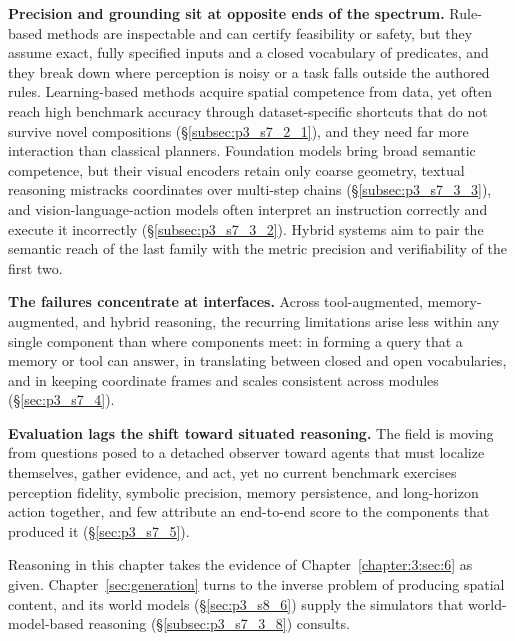 \textbf{Precision and grounding sit at opposite ends of the spectrum.} Rule-based methods are inspectable and can certify feasibility or safety, but they assume exact, fully specified inputs and a closed vocabulary of predicates, and they break down where perception is noisy or a task falls outside the authored rules. Learning-based methods acquire spatial competence from data, yet often reach high benchmark accuracy through dataset-specific shortcuts that do not survive novel compositions (§\ref{subsec:p3_s7_2_1}), and they need far more interaction than classical planners. Foundation models bring broad semantic competence, but their visual encoders retain only coarse geometry, textual reasoning mistracks coordinates over multi-step chains (§\ref{subsec:p3_s7_3_3}), and vision-language-action models often interpret an instruction correctly and execute it incorrectly (§\ref{subsec:p3_s7_3_2}). Hybrid systems aim to pair the semantic reach of the last family with the metric precision and verifiability of the first two.

\textbf{The failures concentrate at interfaces.} Across tool-augmented, memory-augmented, and hybrid reasoning, the recurring limitations arise less within any single component than where components meet: in forming a query that a memory or tool can answer, in translating between closed and open vocabularies, and in keeping coordinate frames and scales consistent across modules (§\ref{sec:p3_s7_4}).

\textbf{Evaluation lags the shift toward situated reasoning.} The field is moving from questions posed to a detached observer toward agents that must localize themselves, gather evidence, and act, yet no current benchmark exercises perception fidelity, symbolic precision, memory persistence, and long-horizon action together, and few attribute an end-to-end score to the components that produced it (§\ref{sec:p3_s7_5}).

Reasoning in this chapter takes the evidence of Chapter~\ref{chapter:3:sec:6} as given. Chapter~\ref{sec:generation} turns to the inverse problem of producing spatial content, and its world models (§\ref{sec:p3_s8_6}) supply the simulators that world-model-based reasoning (§\ref{subsec:p3_s7_3_8}) consults.
